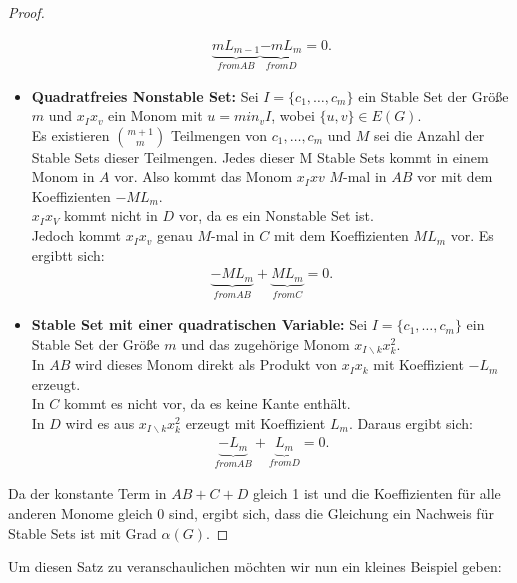 \begin{proof}
\begin{itemize}
\begin{align*}
\underbrace{mL_{m-1}}_{from AB}  \underbrace{-mL_m}_{from D} = 0.
\end{align*}
\item \textbf{Quadratfreies Nonstable Set:} Sei $I=\{c_1,\ldots,c_m\}$ ein Stable Set der Größe $m$ und $x_Ix_v$ ein Monom mit $u=min_vI$, wobei $\{u,v\} \in E(G)$. \\
Es existieren $\binom{m+1}{m}$ Teilmengen von ${c_1,\ldots,c_m}$ und $M$ sei die Anzahl der Stable Sets dieser Teilmengen. Jedes dieser M Stable Sets kommt in einem Monom in $A$ vor. Also kommt das Monom $x_Ixv$ $M$-mal in \textbf{$AB$} vor mit dem Koeffizienten $-ML_m$.\\
$x_Ix_V$ kommt nicht in \textbf{$D$} vor, da es ein Nonstable Set ist.\\
Jedoch kommt $x_Ix_v$ genau $M$-mal  in \textbf{$C$} mit dem Koeffizienten $ML_m$ vor. Es ergibtt sich:
\begin{align*}
\underbrace{-ML_m}_{from AB} + \underbrace{ML_m}_{from C} = 0. 
\end{align*}
\item \textbf{Stable Set mit einer quadratischen Variable:} Sei $I=\{c_1,\ldots,c_m\}$ ein Stable Set der Größe $m$ und das zugehörige Monom $x_{I\backslash k}x_k^2$.\\
In \textbf{$AB$} wird dieses Monom direkt als Produkt von $x_Ix_k$ mit Koeffizient $-L_m$ erzeugt.\\
In \textbf{$C$} kommt es nicht vor, da es keine Kante enthält.\\
In \textbf{$D$} wird es aus $x_{I\backslash k}x_k^2$ erzeugt mit Koeffizient $L_m$. Daraus ergibt sich:
\begin{align*}
\underbrace{-L_m}_{from AB} + \underbrace{L_m}_{from D} = 0.
\end{align*}
\end{itemize}
Da der konstante Term in $AB+C+D$ gleich 1 ist und die Koeffizienten für alle anderen Monome gleich 0 sind, ergibt sich, dass die Gleichung ein Nachweis für Stable Sets ist mit Grad $\alpha(G)$.
\end{proof}

\noindent Um diesen Satz zu veranschaulichen möchten wir nun ein kleines Beispiel geben:


